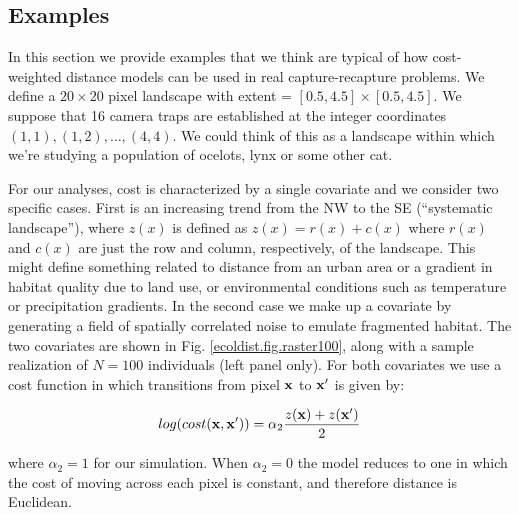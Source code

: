 \documentclass[12pt]{article}
\begin{document}
\begin{spacing}{1.8}
\section{Examples}

In this section we provide examples that we think are typical of how
cost-weighted distance models can be used in real capture-recapture
problems.  We define a $20 \times 20$ pixel landscape with
extent = $[0.5, 4.5] \times [0.5, 4.5]$.
We suppose that 16 camera traps are established at the integer coordinates
$(1,1), (1,2), \ldots, (4,4)$. We could think of this as a landscape
within which we're studying a population of ocelots, lynx or some
other cat.

For our analyses, cost is characterized by a single covariate
and we consider two specific cases. First is an increasing trend from
the NW to the SE (``systematic landscape''), where $z(x)$ is defined as
$z(x) = r(x) + c(x)$ where $r(x)$ and $c(x)$ are just the row and
column, respectively, of the landscape.  This might define something
related to distance from an urban area or a gradient in habitat
quality due to land use, or environmental conditions such as
temperature or precipitation gradients.  In the second case we make up
a covariate by generating a field of spatially correlated noise to
emulate fragmented habitat.
The two covariates are shown in Fig. \ref{ecoldist.fig.raster100},
along with a sample realization of
$N=100$ individuals (left panel only).  For both covariates we use a
cost function in which transitions from pixel ${\bf x}$ to ${\bf x}'$
is given by:

\[
 log(cost({\bf x},{\bf x}'))=  \alpha_2 \frac{z({\bf x}) + z({\bf x}')}{2}
\]

{\flushleft where} $\alpha_2 = 1$ for our simulation.
When $\alpha_2=0$ the
model reduces to one in which the cost of moving across each pixel is
constant, and therefore distance is Euclidean.


\end{spacing}
\end{document}
